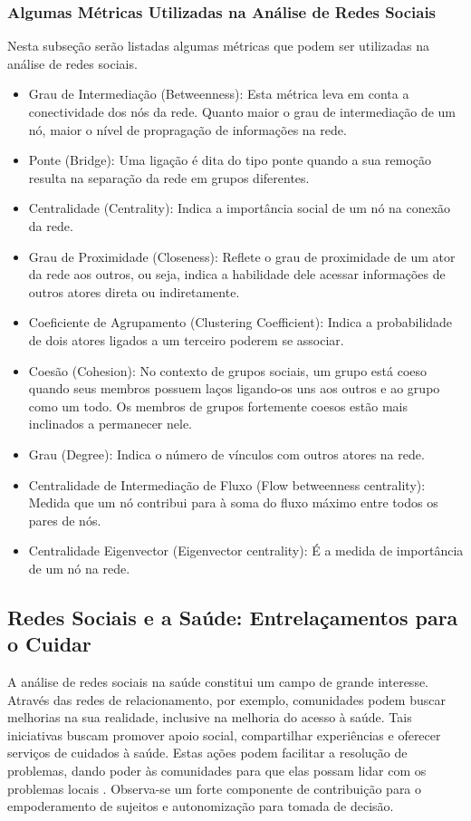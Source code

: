 \subsubsection{Algumas Métricas Utilizadas na Análise de Redes Sociais}
Nesta subseção serão listadas algumas métricas que podem ser utilizadas na análise de redes sociais.

\begin{itemize}
 \item Grau de Intermediação (Betweenness): Esta métrica leva em conta a conectividade dos nós da rede. Quanto maior o grau de intermediação de um nó, maior o nível de propragação de informações na rede.
 \item Ponte (Bridge): Uma ligação é dita do tipo ponte quando a sua remoção resulta na separação da rede em grupos diferentes.
 \item Centralidade (Centrality): Indica a importância social de um nó na conexão da rede.
 \item Grau de Proximidade (Closeness): Reflete o grau de proximidade de um ator da rede aos outros, ou seja, indica a habilidade dele acessar informações de outros atores direta ou indiretamente.
 \item Coeficiente de Agrupamento (Clustering Coefficient): Indica a probabilidade de dois atores ligados a um terceiro poderem se associar.
 \item Coesão (Cohesion): No contexto de grupos sociais, um grupo está coeso quando seus membros possuem laços ligando-os uns aos outros e ao grupo como um todo. Os membros de grupos fortemente coesos estão mais inclinados a permanecer nele.
 \item Grau (Degree): Indica o número de vínculos com outros atores na rede.
 \item Centralidade de Intermediação de Fluxo (Flow betweenness centrality): Medida que um nó contribui para à soma do fluxo máximo entre todos os pares de nós.
 \item Centralidade Eigenvector (Eigenvector centrality): É a medida de importância de um nó na rede.
\end{itemize}

\subsection{Redes Sociais e a Saúde: Entrelaçamentos para o Cuidar}
A análise de redes sociais na saúde constitui um campo de grande interesse. Através das redes de relacionamento, por exemplo, comunidades podem buscar melhorias na sua realidade, inclusive na melhoria do acesso à saúde. Tais iniciativas buscam promover apoio social, compartilhar experiências e oferecer serviços de cuidados à saúde. Estas ações podem facilitar a resolução de problemas, dando poder às comunidades para que elas possam lidar com os problemas locais \cite{maior2004formaccao}. Observa-se um forte componente de contribuição para o empoderamento de sujeitos e autonomização para tomada de decisão. 

